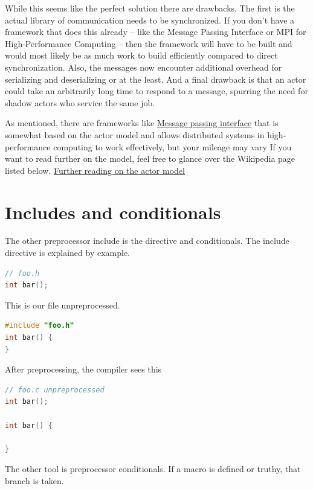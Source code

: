 While this seems like the perfect solution there are drawbacks.
The first is the actual library of communication needs to be synchronized.
If you don't have a framework that does this already -- like the Message Passing Interface or MPI for High-Performance Computing -- then the framework will have to be built and would most likely be as much work to build efficiently compared to direct synchronization.
Also, the messages now encounter additional overhead for serializing and deserializing or at the least.
And a final drawback is that an actor could take an arbitrarily long time to respond to a message, spurring the need for shadow actors who service the same job.

As mentioned, there are frameworks like \href{https://en.wikipedia.org/wiki/Message\_Passing\_Interface}{Message passing interface} that is somewhat based on the actor model and allows distributed systems in high-performance computing to work effectively, but your mileage may vary
If you want to read further on the model, feel free to glance over the Wikipedia page listed below.
\href{https://en.wikipedia.org/wiki/Actor\_model}{Further reading on the actor model}


\section{Includes and conditionals}

The other preprocessor include is the  directive and conditionals.
The include directive is explained by example.

\begin{lstlisting}[language=C]
// foo.h
int bar();
\end{lstlisting}

This is our file  unpreprocessed.

\begin{lstlisting}[language=C]
#include "foo.h"
int bar() {
}
\end{lstlisting}

After preprocessing, the compiler sees this

\begin{lstlisting}[language=C]
// foo.c unpreprocessed
int bar();

int bar() {

}
\end{lstlisting}

The other tool is preprocessor conditionals.
If a macro is defined or truthy, that branch is taken.


